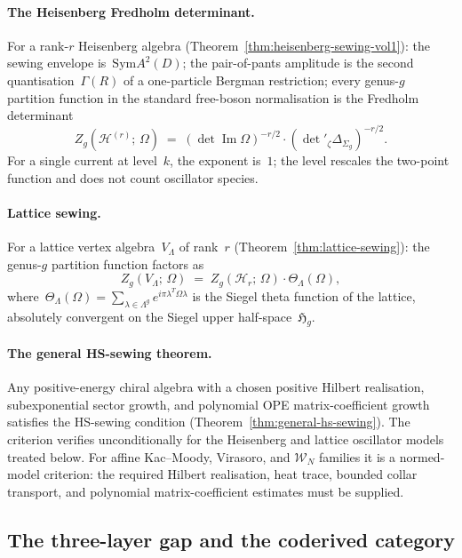 \documentclass[11pt,reqno]{amsart}
\theoremstyle{definition}
\theoremstyle{remark}
\newcommand{\cH}{\mathcal{H}}
\newcommand{\cW}{\mathcal{W}}
\newcommand{\Sym}{\mathrm{Sym}}
\newcommand{\fH}{\mathfrak{H}}
\newcommand{\GG}{\Gamma}
\numberwithin{equation}{section}
\begin{document}
\paragraph{The Heisenberg Fredholm determinant.}
For a rank-$r$ Heisenberg algebra
(Theorem~\ref{thm:heisenberg-sewing-vol1}): the sewing envelope
is~$\Sym A^2(D)$; the pair-of-pants amplitude is the second
quantisation~$\GG(R)$ of a one-particle Bergman restriction;
every genus-$g$ partition function in the standard free-boson
normalisation is the Fredholm determinant
\begin{equation}\label{eq:heisenberg-intro}
Z_g(\cH^{(r)};\,\Omega)
\;=\;
(\det\operatorname{Im}\Omega)^{-r/2}
\cdot (\det{}'_\zeta \Delta_{\Sigma_g})^{-r/2}.
\end{equation}
For a single current at level~$k$, the exponent is~$1$; the level
rescales the two-point function and does not count oscillator
species.

\paragraph{Lattice sewing.}
For a lattice vertex algebra~$V_\Lambda$ of rank~$r$
(Theorem~\ref{thm:lattice-sewing}): the genus-$g$ partition
function factors as
\begin{equation}\label{eq:lattice-intro}
Z_g(V_\Lambda;\,\Omega)
\;=\;
Z_g(\cH_r;\,\Omega)
\cdot \Theta_\Lambda(\Omega),
\end{equation}
where~$\Theta_\Lambda(\Omega)
= \sum_{\lambda \in \Lambda^g}
e^{i\pi\lambda^T\Omega\lambda}$ is the Siegel theta function
of the lattice, absolutely convergent on the Siegel upper
half-space~$\fH_g$.

\paragraph{The general HS-sewing theorem.}
Any positive-energy chiral algebra with a chosen positive Hilbert
realisation, subexponential sector growth, and polynomial OPE
matrix-coefficient growth satisfies the HS-sewing condition
(Theorem~\ref{thm:general-hs-sewing}).  The criterion verifies
unconditionally for the Heisenberg and lattice oscillator models
treated below. For affine Kac--Moody, Virasoro, and $\cW_N$
families it is a normed-model criterion: the required Hilbert
realisation, heat trace, bounded collar transport, and polynomial
matrix-coefficient estimates must be supplied.

\subsection{The three-layer gap and the coderived
 category}\label{subsec:gap-intro}
\end{document}
